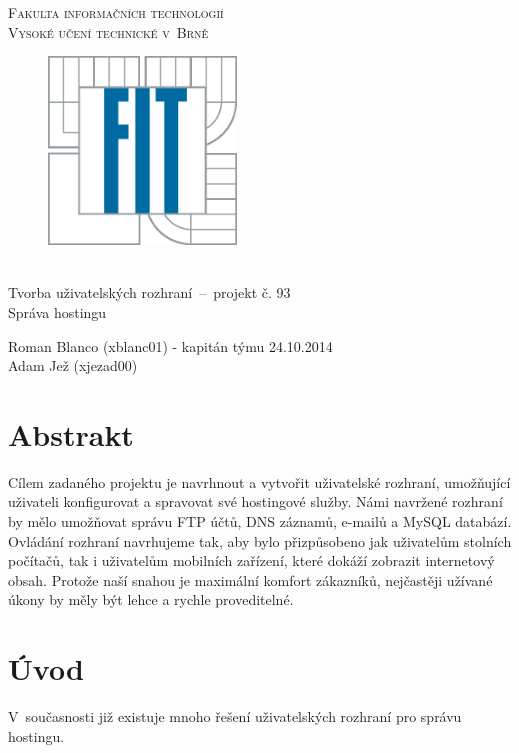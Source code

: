 \documentclass[11pt,a4paper]{article}
\begin{document}
  \begin{titlepage}
    \begin{center}
      \Huge
      \textsc{Fakulta informačních technologií \\ Vysoké učení technické v~Brně}
      \vspace{100px}
      \begin{figure}[!h]
        \centering
        \includegraphics[height=5cm]{logo}
      \end{figure}
      \\[50mm]
      \LARGE{Tvorba uživatelských rozhraní \,--\, projekt č. 93 \\
             Správa hostingu}
      \vfill
    \end{center}
    \Large{Roman Blanco (xblanc01) - kapitán týmu \hfill 24.10.2014 \\
           Adam Jež (xjezad00)}

  \end{titlepage}

  \section{Abstrakt}

    Cílem zadaného projektu je navrhnout a vytvořit uživatelské rozhraní,
    umožňující uživateli konfigurovat a spravovat své hostingové služby.
    Námi navržené rozhraní by mělo umožňovat správu FTP účtů, DNS
    záznamů, e-mailů a MySQL databází. Ovládání rozhraní navrhujeme tak, aby
    bylo přizpůsobeno jak uživatelům stolních počítačů, tak i uživatelům
    mobilních zařízení, které dokáží zobrazit internetový obsah. Protože naší
    snahou je maximální komfort zákazníků, nejčastěji užívané úkony by měly
    být lehce a rychle proveditelné.

  \section{Úvod}

    V~současnosti již existuje mnoho řešení uživatelských rozhraní pro správu
    hostingu.
\end{document}
